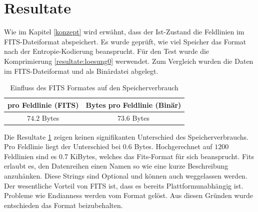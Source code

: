 \section{Resultate}\label{resultate}
Wie im Kapitel \ref{konzept} wird erwähnt, dass der Ist-Zustand die Feldlinien im FITS-Dateiformat abspeichert. Es wurde geprüft, wie viel Speicher das Format nach der Entropie-Kodierung beansprucht. Für den Test wurde die Komprimierung \ref{resultate:loesung0} werwendet. Zum Vergleich wurden die Daten im FITS-Dateiformat und als Binärdatei abgelegt.
\begin{table}[!htbp]
\center
\begin{tabular}{c|c}
	 pro Feldlinie (FITS) & Bytes pro Feldlinie (Binär)\\\hline
	$74.2$ Bytes & $73.6$ Bytes\\
\end{tabular}
\caption{Einfluss des FITS Formates auf den Speicherverbrauch}
\label{resultate:fits_table}
\end{table}
Die Resultate \ref{resultate:fits_table} zeigen keinen signifikanten Unterschied des Speicherverbrauchs. Pro Feldlinie liegt der Unterschied bei $0.6$ Bytes. Hochgerechnet auf $1200$ Feldlinien sind es 0.7 KiBytes, welches das Fits-Format für sich beansprucht. Fits erlaubt es, den Datenreihen einen Namen so wie eine kurze Beschreibung anzuhänken. Diese Strings sind Optional und können auch weggelassen werden.\\
Der wesentliche Vorteil von FITS ist, dass es bereits Plattformunabhängig ist. Probleme wie Endianness \cite{wiki:endianess} werden vom Format gelöst. Aus diesen Gründen wurde entschieden das Format beizubehalten.

